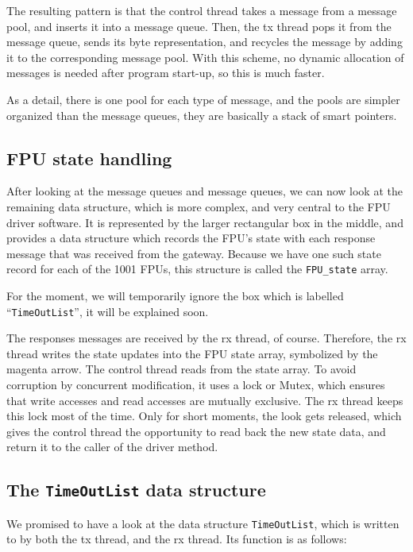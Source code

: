 \documentclass[fontsize=12,a4paper]{scrartcl}
\begin{document}
The resulting pattern is that the control thread takes a message from
a message pool, and inserts it into a message queue. Then, the tx
thread pops it from the message queue, sends its byte representation,
and recycles the message by adding it to the corresponding message
pool. With this scheme, no dynamic allocation of messages is needed
after program start-up, so this is much faster.

As a detail, there is one pool for each type of message, and the pools
are simpler organized than the message queues, they are basically a
stack of smart pointers.

\subsection{FPU state handling}

After looking at the message queues and message queues, we can now
look at the remaining data structure, which is more complex, and very
central to the FPU driver software. It is represented by the larger
rectangular box in the middle, and provides a data structure which
records the FPU's state with each response message that was received
from the gateway. Because we have one such state record for each of
the 1001 FPUs, this structure is called the \texttt{FPU\_state} array.

For the moment, we will temporarily ignore the box which is labelled
``\texttt{TimeOutList}'', it will be explained soon.

The responses messages are received by the rx thread, of course.
Therefore, the rx thread writes the state updates into the FPU state
array, symbolized by the magenta arrow. The control thread reads from
the state array. To avoid corruption by concurrent modification, it
uses a lock or Mutex, which ensures that write accesses and read
accesses are mutually exclusive. The rx thread keeps this lock most of
the time. Only for short moments, the look gets released, which gives
the control thread the opportunity to read back the new state data,
and return it to the caller of the driver method.

\subsection{The \texttt{TimeOutList} data structure}

We promised to have a look at the data structure
\texttt{TimeOutList}, which is written to by both
the tx thread, and the rx thread. Its function is
as follows:
\end{document}
